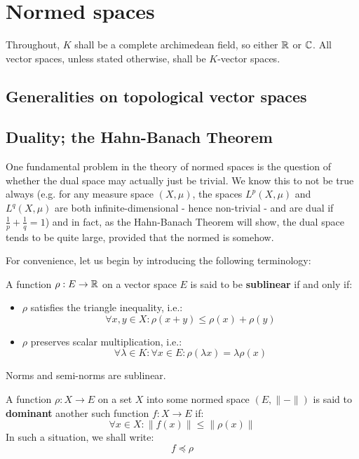 \section{Normed spaces}
    Throughout, $K$ shall be a complete archimedean field, so either $\mathbb{R}$ or $\mathbb{C}$. All vector spaces, unless stated otherwise, shall be $K$-vector spaces. 
 
    \subsection{Generalities on topological vector spaces}

    \subsection{Duality; the Hahn-Banach Theorem}
        One fundamental problem in the theory of normed spaces is the question of whether the dual space may actually just be trivial. We know this to not be true always (e.g. for any measure space $(X, \mu)$, the spaces $L^p(X, \mu)$ and $L^q(X, \mu)$ are both infinite-dimensional - hence non-trivial - and are dual if $\frac1p + \frac1q = 1$) and in fact, as the Hahn-Banach Theorem will show, the dual space tends to be quite large, provided that the normed is  somehow.

        For convenience, let us begin by introducing the following terminology:
        \begin{definition}[Sublinearity] \label{def: sublinearity}
            A function $\rho: E \to \mathbb{R}$ on a vector space $E$ is said to be \textbf{sublinear} if and only if:
            \begin{itemize}
                \item $\rho$ satisfies the triangle inequality, i.e.:
                    $$\forall x, y \in X: \rho(x + y) \leq \rho(x) + \rho(y)$$
                \item $\rho$ preserves scalar multiplication, i.e.:
                    $$\forall \lambda \in K: \forall x \in E: \rho(\lambda x) = \lambda \rho(x)$$
            \end{itemize}
        \end{definition}
        \begin{example}
            Norms and semi-norms are sublinear. 
        \end{example}
        \begin{definition}[Dominance] \label{def: dominance}
            A function $\rho: X \to E$ on a set $X$ into some normed space $(E, \|-\|)$ is said to \textbf{dominant} another such function $f: X \to E$ if:
                $$\forall x \in X: \|f(x)\| \leq \|\rho(x)\|$$
            In such a situation, we shall write:
                $$f \preccurlyeq \rho$$
        \end{definition}


